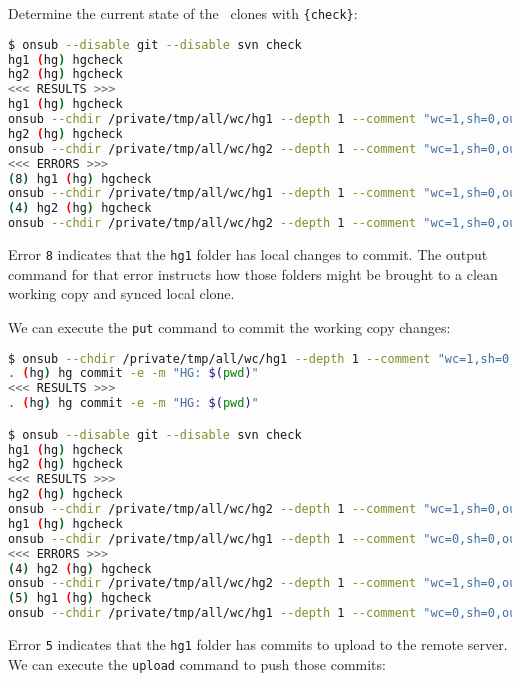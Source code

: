 Determine the current state of the \hg\ clones with \lstinline|{check}|:

\begin{snugshade}
\begin{lstlisting}[language=bash]	
$ onsub --disable git --disable svn check
hg1 (hg) hgcheck
hg2 (hg) hgcheck
<<< RESULTS >>>
hg1 (hg) hgcheck
onsub --chdir /private/tmp/all/wc/hg1 --depth 1 --comment "wc=1,sh=0,out=0,in=0" {put}
hg2 (hg) hgcheck
onsub --chdir /private/tmp/all/wc/hg2 --depth 1 --comment "wc=1,sh=0,out=1,in=0" {put-upload}
<<< ERRORS >>>
(8) hg1 (hg) hgcheck
onsub --chdir /private/tmp/all/wc/hg1 --depth 1 --comment "wc=1,sh=0,out=0,in=0" {put}
(4) hg2 (hg) hgcheck
onsub --chdir /private/tmp/all/wc/hg2 --depth 1 --comment "wc=1,sh=0,out=1,in=0" {put-upload}
\end{lstlisting}
\end{snugshade}

Error \lstinline{8} indicates that the \lstinline{hg1} folder has local changes to commit. The output command for that error instructs how those folders might be brought to a clean working copy and synced local clone.

We can execute the \lstinline{put} command to commit the working copy changes:

\begin{snugshade}
\begin{lstlisting}[language=bash]	
$ onsub --chdir /private/tmp/all/wc/hg1 --depth 1 --comment "wc=1,sh=0,out=0,in=0" {put}
. (hg) hg commit -e -m "HG: $(pwd)"
<<< RESULTS >>>
. (hg) hg commit -e -m "HG: $(pwd)"

$ onsub --disable git --disable svn check
hg1 (hg) hgcheck
hg2 (hg) hgcheck
<<< RESULTS >>>
hg2 (hg) hgcheck
onsub --chdir /private/tmp/all/wc/hg2 --depth 1 --comment "wc=1,sh=0,out=1,in=0" {put-upload}
hg1 (hg) hgcheck
onsub --chdir /private/tmp/all/wc/hg1 --depth 1 --comment "wc=0,sh=0,out=1,in=0" {upload}
<<< ERRORS >>>
(4) hg2 (hg) hgcheck
onsub --chdir /private/tmp/all/wc/hg2 --depth 1 --comment "wc=1,sh=0,out=1,in=0" {put-upload}
(5) hg1 (hg) hgcheck
onsub --chdir /private/tmp/all/wc/hg1 --depth 1 --comment "wc=0,sh=0,out=1,in=0" {upload}
\end{lstlisting}
\end{snugshade}

Error \lstinline{5} indicates that the \lstinline{hg1} folder has commits to upload to the remote server. We can execute the \lstinline{upload} command to push those commits:

